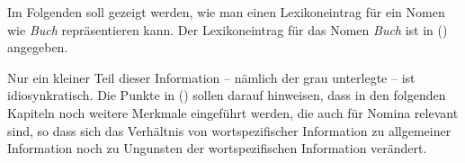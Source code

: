 Im Folgenden soll gezeigt werden, wie man einen Lexikoneintrag für ein Nomen wie \emph{Buch} repräsentieren
kann. Der Lexikoneintrag für das Nomen \emph{Buch} ist in () angegeben.
\begin{figure}
\ea
{}
\z
\vspace{-\baselineskip}
\end{figure}
Nur ein kleiner Teil dieser Information -- nämlich der grau unterlegte -- ist idiosynkratisch.
Die Punkte in () sollen darauf hinweisen, dass in den folgenden Kapiteln noch weitere Merkmale
eingeführt werden, die auch für Nomina relevant sind, so dass sich das Verhältnis von wortspezifischer
Information zu allgemeiner Information noch zu Ungunsten der wortspezifischen Information
verändert.

